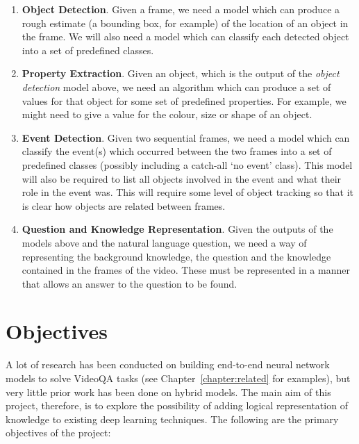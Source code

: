 \documentclass[../interim.tex]{subfiles}
\begin{document}
\begin{enumerate}
  \item \textbf{Object Detection}. Given a frame, we need a model which can produce a rough estimate (a bounding box, for example) of the location of an object in the frame. We will also need a model which can classify each detected object into a set of predefined classes.

  \item \textbf{Property Extraction}. Given an object, which is the output of the \textit{object detection} model above, we need an algorithm which can produce a set of values for that object for some set of predefined properties. For example, we might need to give a value for the colour, size or shape of an object.

  \item \textbf{Event Detection}. Given two sequential frames, we need a model which can classify the event(s) which occurred between the two frames into a set of predefined classes (possibly including a catch-all `no event' class). This model will also be required to list all objects involved in the event and what their role in the event was. This will require some level of object tracking so that it is clear how objects are related between frames.

  \item \textbf{Question and Knowledge Representation}. Given the outputs of the models above and the natural language question, we need a way of representing the background knowledge, the question and the knowledge contained in the frames of the video. These must be represented in a manner that allows an answer to the question to be found.
\end{enumerate}


\section{Objectives}

A lot of research has been conducted on building end-to-end neural network models to solve VideoQA tasks (see Chapter~\ref{chapter:related} for examples), but very little prior work has been done on hybrid models. The main aim of this project, therefore, is to explore the possibility of adding logical representation of knowledge to existing deep learning techniques. The following are the primary objectives of the project:
\end{document}
